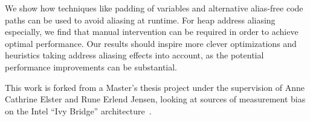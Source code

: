 \documentclass[prodmode,acmtaco]{acmsmall}
\begin{document}
We show how techniques like padding of variables and alternative alias-free code paths can be used to avoid aliasing at runtime.
For heap address aliasing especially, we find that manual intervention can be required in order to achieve optimal performance.
Our results should inspire more clever optimizations and heuristics taking address aliasing effects into account, as the potential performance improvements can be substantial.

\begin{acks}
This work is forked from a Master's thesis project under the supervision of Anne Cathrine Elster and Rune Erlend Jensen, looking at sources of measurement bias on the Intel ``Ivy Bridge'' architecture~\cite{MasterThesis}.
\end{acks}




\received{}{}{}
\end{document}
